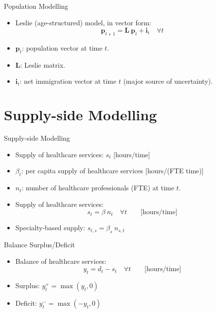 \documentclass[aspectratio=169, 10pt]{beamer}
\begin{document}
\begin{frame}{Population Modelling}
    \begin{itemize}
        \item Leslie (age-structured) model, in vector form:
        \begin{equation*}
            \mathbf{p}_{t+1} = \mathbf{L}\ \mathbf{p}_{t} + \mathbf{i}_{t} \quad \forall t
        \end{equation*}
        \item $\mathbf{p}_{t}$: population vector at time $t$.
        \item $\mathbf{L}$: Leslie matrix.
        \item $\mathbf{i}_{t}$: net immigration vector at time $t$ (major source of uncertainty).
    \end{itemize}

\end{frame}


\section{Supply-side Modelling}
\begin{frame}{Supply-side Modelling}
    \begin{itemize}
        \item Supply of healthcare services: $s_{t}$ [hours/time]
        \item $\beta_t$: per capita supply of healthcare services [hours/(FTE time)]
        \item $n_{t}$: number of healthcare professionals (FTE) at time $t$.
        \item Supply of healthcare services:
        \begin{equation*}
            s_{t} = \beta\ n_{t} \quad \forall t \quad\quad \text{[hours/time]}
        \end{equation*}
        \item Specialty-based supply: $s_{t,s} = \beta_{s}\ n_{s,t}$
    \end{itemize}
\end{frame}


\begin{frame}{Balance Surplus/Deficit}
    \begin{itemize}
        \item Balance of healthcare services:
        \begin{equation*}
            y_{t} = d_{t} - s_{t} \quad \forall t \quad\quad \text{[hours/time]}
        \end{equation*}
        \item Surplus: $y_{t}^{+} = \max(y_{t}, 0)$
        \item Deficit: $y_{t}^{-} = \max(-y_{t}, 0)$
    \end{itemize}
\end{frame}
\end{document}
